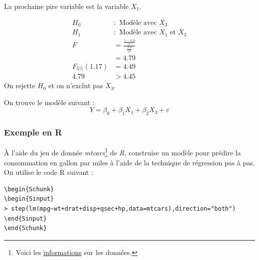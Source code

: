 \documentclass[11pt,french]{report}
\begin{document}
La prochaine pire variable est la variable $X_1$.

\begin{align*}
H_0 &: \text{ Modèle avec $X_3$} \\
H_1 &: \text{ Modèle avec $X_1$ et $X_3$} \\
F &= \frac{\frac{5 - 3.9}{1}}{\frac{3.9}{17}} \\
&= 4.79 \\
F_{5 \%}(1.17) &= 4.49 \\
4.79 &> 4.45
\end{align*}
On rejette $H_0$ et on n'exclut pas $X_3$. \newline

On trouve le modèle suivant :
$$
Y = \beta_0 + \beta_1X_1 + \beta_2X_3 + \varepsilon
$$

\subsubsection*{Exemple en R}
À l'aide du jeu de donnée \emph{mtcars}\footnote{Voici les \href{https://stat.ethz.ch/R-manual/R-devel/library/datasets/html/mtcars.html}{informations} sur les données.} de \emph{R}, construise un modèle pour prédire la consommation en gallon par miles à l'aide de la technique de régression pas à pas. On utilise le code R suivant :
\begin{lstlisting}[linerange=\\begin\{Sinput\}-\\end\{Sinput\},includerangemarker=false]
\begin{Schunk}
\begin{Sinput}
> step(lm(mpg~wt+drat+disp+qsec+hp,data=mtcars),direction="both")
\end{Sinput}
\end{Schunk}
\end{lstlisting}
\end{document}
